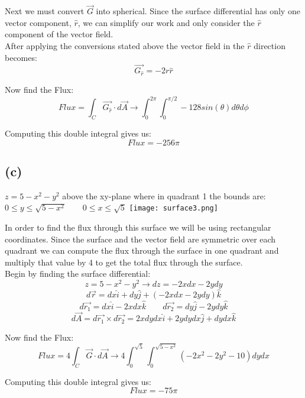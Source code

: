 \documentclass[11pt]{article}
\begin{document}
Next we must convert $\vec{G}$ into spherical. Since the surface differential has only one vector component, $\hat{r}$, we can simplify our work and only consider the $\hat{r}$ component of the vector field.
\\

After applying the conversions stated above the vector field in the $\hat{r}$ direction becomes:
$$\vec{G_{\hat{r}}} = -2r\hat{r}$$

Now find the Flux:
$$Flux = \int_C \vec{G_{\hat{r}}} \cdot d\vec{A} \rightarrow \int_{0}^{2\pi} \int_{0}^{\pi/2} -128sin(\theta)d\theta d\phi$$

Computing this double integral gives us:
$$Flux = -256 \pi$$

\subsection*{(c)}
\begin{center}
    $z = 5 - x^2 -y^2$ above the xy-plane where in quadrant 1 the bounds are: $0 \leq y \leq \sqrt{5-x^2} \qquad 0 \leq x \leq \sqrt{5} $
        \texttt{[image: surface3.png]}
\end{center}

In order to find the flux through this surface we will be using rectangular coordinates. Since the surface and the vector field are symmetric over each quadrant we can compute the flux through the surface in one quadrant and multiply that value by 4 to get the total flux through the surface.
\\

Begin by finding the surface differential:
$$z = 5-x^2-y^2 \rightarrow dz = -2xdx - 2ydy$$
$$d\vec{r} = dx\hat{i} + dy\hat{j} + (-2xdx-2ydy)\hat{k}$$
$$d\vec{r_1} = dx\hat{i} - 2xdx\hat{k} \qquad d\vec{r_2} = dy\hat{j} - 2ydy\hat{k} $$
$$d\vec{A} = d\vec{r_1} \times d\vec{r_2} = 2xdydx \hat{i} + 2ydydx\hat{j}+dydx\hat{k}$$

Now find the Flux:
$$Flux = 4\int_C \vec{G} \cdot d\vec{A} \rightarrow 4\int_{0}^{\sqrt{5}}\int_{0}^{\sqrt{5-x^2}} (-2x^2-2y^2-10)dydx$$

Computing this double integral gives us:
$$Flux = -75\pi$$
\end{document}
